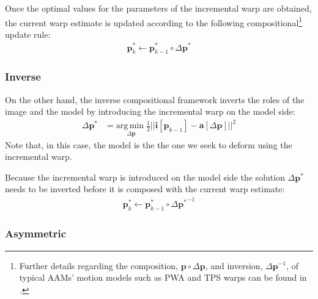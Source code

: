 Once the optimal values for the parameters of the incremental warp are obtained, the current warp estimate is updated according to the following compositional\footnote{\label{foot:warp}Further details regarding the composition, $\mathbf{p} \circ \Delta \mathbf{p}$, and inversion, $\Delta \mathbf{p}^{-1}$, of typical AAMs' motion models such as PWA and TPS warps can be found in \cite{Matthews2004, Papandreou2008}.} update rule:
\begin{equation}
 	\begin{aligned}
    	\mathbf{p}_k^* \leftarrow \mathbf{p}_{k-1}^* \circ \Delta \mathbf{p}^*
    \label{eq:fc_update}
    \end{aligned}
\end{equation}

\subsubsection{Inverse}
\label{sec:inverse}

On the other hand, the inverse compositional framework inverts the roles of the image and the model by introducing the incremental warp on the model side:
\begin{equation}
    \begin{aligned}
        \Delta \mathbf{p}^* & = \underset{\Delta \mathbf{p}} {\mathrm{arg\, min\;}} \frac{1}{2}|| \mathbf{i}[\mathbf{p}_{k-1}] - \mathbf{a} [\Delta \mathbf{p}] ||^2
    \label{eq:ssd_ic}
    \end{aligned}
\end{equation}
Note that, in this case, the model is the the one we seek to deform using the incremental warp.

Because the incremental warp is introduced on the model side the solution $\Delta \mathbf{p}^*$ needs to be inverted before it is composed with the current warp estimate:
\begin{equation}
 	\begin{aligned}
    	\mathbf{p}_k^* \leftarrow \mathbf{p}_{k-1}^* \circ \Delta {\mathbf{p}^*}^{-1} 
    \label{eq:ic_update}
    \end{aligned}
\end{equation}

\subsubsection{Asymmetric}
\label{sec:asymmetric}

